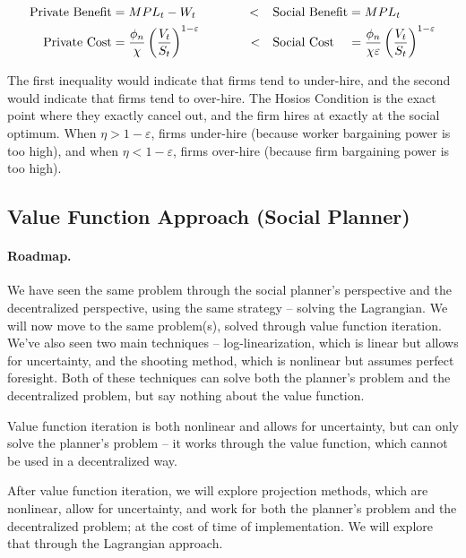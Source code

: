 \documentclass[10pt]{article}
\begin{document}
\begin{align*}
	\text{Private Benefit} &= MPL_t - W_t \qquad\qquad <  &&\text{Social Benefit} = MPL_t \\
	\text{Private Cost} &= \frac{\phi_n}{\chi}\left( \frac{V_t}{S_t}\right)^{1-\varepsilon} \qquad\quad\;\;\; <  &&\text{Social Cost}\;\;\;\; = \frac{\phi_n}{\chi\varepsilon} \left( \frac{V_t}{S_t}\right)^{1-\varepsilon}
\end{align*}

The first inequality would indicate that firms tend to under-hire, and the second would indicate that firms tend to over-hire. The Hosios Condition is the exact point where they exactly cancel out, and the firm hires at exactly at the social optimum. When $\eta > 1-\varepsilon$, firms under-hire (because worker bargaining power is too high), and when $\eta < 1-\varepsilon$, firms over-hire (because firm bargaining power is too high).


\subsection{Value Function Approach (Social Planner)}

\paragraph{Roadmap.} We have seen the same problem through the social planner's perspective and the decentralized perspective, using the same strategy -- solving the Lagrangian. We will now move to the same problem(s), solved through value function iteration. We've also seen two main techniques -- log-linearization, which is linear but allows for uncertainty, and the shooting method, which is nonlinear but assumes perfect foresight. Both of these techniques can solve both the planner's problem and the decentralized problem, but say nothing about the value function.

Value function iteration is both nonlinear and allows for uncertainty, but can only solve the planner's problem -- it works through the value function, which cannot be used in a decentralized way. 

After value function iteration, we will explore projection methods, which are nonlinear, allow for uncertainty, and work for both the planner's problem and the decentralized problem; at the cost of time of implementation. We will explore that through the Lagrangian approach.
\end{document}
